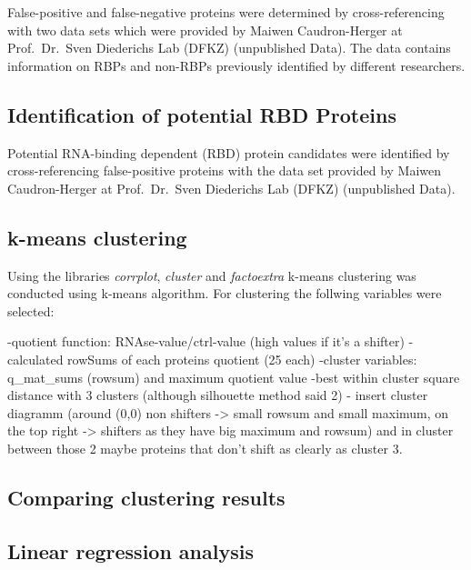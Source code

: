 \documentclass[
]{article}
\begin{document}
False-positive and false-negative proteins were determined by
cross-referencing with two data sets which were provided by Maiwen
Caudron-Herger at Prof.~Dr.~Sven Diederichs Lab (DFKZ) (unpublished
Data). The data contains information on RBPs and non-RBPs previously
identified by different researchers.

\hypertarget{identification-of-potential-rbd-proteins}{%
\subsection{Identification of potential RBD
Proteins}\label{identification-of-potential-rbd-proteins}}

Potential RNA-binding dependent (RBD) protein candidates were identified
by cross-referencing false-positive proteins with the data set provided
by Maiwen Caudron-Herger at Prof.~Dr.~Sven Diederichs Lab (DFKZ)
(unpublished Data).

\hypertarget{k-means-clustering}{%
\subsection{k-means clustering}\label{k-means-clustering}}

Using the libraries \emph{corrplot}, \emph{cluster} and
\emph{factoextra} k-means clustering was conducted using k-means
algorithm. For clustering the follwing variables were selected:

-quotient function: RNAse-value/ctrl-value (high values if it's a
shifter) -calculated rowSums of each proteins quotient (25 each)
-cluster variables: q\_mat\_sums (rowsum) and maximum quotient value
-best within cluster square distance with 3 clusters (although
silhouette method said 2) - insert cluster diagramm (around (0,0) non
shifters -\textgreater{} small rowsum and small maximum, on the top
right -\textgreater{} shifters as they have big maximum and rowsum) and
in cluster between those 2 maybe proteins that don't shift as clearly as
cluster 3.

\hypertarget{comparing-clustering-results}{%
\subsection{Comparing clustering
results}\label{comparing-clustering-results}}

\hypertarget{linear-regression-analysis}{%
\subsection{Linear regression
analysis}\label{linear-regression-analysis}}
\end{document}
